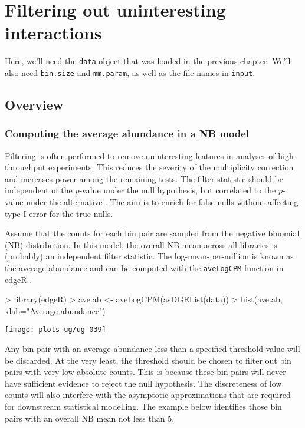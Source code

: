 \documentclass[12pt]{report}
\renewenvironment{Schunk}{\vspace{0pt}}{\vspace{0pt}}
\newcommand{\edgeR}{edgeR}
\newcommand{\code}[1]{{\small\texttt{#1}}}
\newenvironment{combox}
{ \begin{shaded}\begin{center}\begin{minipage}[t]{0.95\textwidth} }
{ \end{minipage}\end{center}\end{shaded} }
\begin{document}
\chapter{Filtering out uninteresting interactions}
\label{chap:filter}

\begin{combox}
Here, we'll need the \code{data} object that was loaded in the previous chapter.
We'll also need \code{bin.size} and \code{mm.param}, as well as the file names in \code{input}.
\end{combox}

\section{Overview}

\subsection{Computing the average abundance in a NB model}
Filtering is often performed to remove uninteresting features in analyses of high-throughput experiments. 
This reduces the severity of the multiplicity correction and increases power among the remaining tests. 
The filter statistic should be independent of the $p$-value under the null hypothesis, but correlated to the $p$-value under the alternative \citep{bourgon2010independent}. 
The aim is to enrich for false nulls without affecting type I error for the true nulls.

Assume that the counts for each bin pair are sampled from the negative binomial (NB) distribution.
In this model, the overall NB mean across all libraries is (probably) an independent filter statistic.
The log-mean-per-million is known as the average abundance and can be computed with the \code{aveLogCPM} function in \edgeR{} \citep{mccarthy2012glm}.

\begin{Schunk}
\begin{Sinput}
> library(edgeR)
> ave.ab <- aveLogCPM(asDGEList(data))
> hist(ave.ab, xlab="Average abundance")
\end{Sinput}
\end{Schunk}

\begin{center}
\texttt{[image: plots-ug/ug-039]}
\end{center}

Any bin pair with an average abundance less than a specified threshold value will be discarded.
At the very least, the threshold should be chosen to filter out bin pairs with very low absolute counts.
This is because these bin pairs will never have sufficient evidence to reject the null hypothesis.
The discreteness of low counts will also interfere with the asymptotic approximations that are required for downstream statistical modelling.
The example below identifies those bin pairs with an overall NB mean not less than 5.
\end{document}
